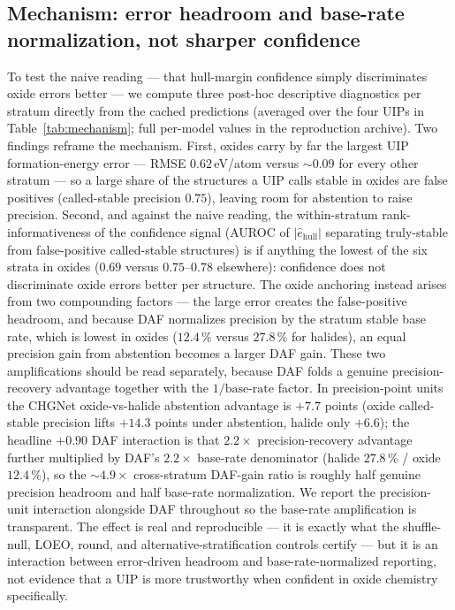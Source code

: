 \documentclass[11pt]{article}
\begin{document}
\subsection{Mechanism: error headroom and base-rate normalization, not sharper confidence}

To test the naive reading --- that hull-margin confidence simply discriminates oxide errors
better --- we compute three post-hoc descriptive diagnostics per stratum directly from the
cached predictions (averaged over the four UIPs in Table~\ref{tab:mechanism}; full per-model
values in the reproduction archive). Two findings reframe the mechanism. First, oxides carry by
far the largest UIP formation-energy error --- RMSE $0.62$\,eV/atom versus $\sim\!0.09$ for every
other stratum --- so a large share of the structures a UIP calls stable in oxides are false
positives (called-stable precision $0.75$), leaving room for abstention to raise precision.
Second, and against the naive reading, the within-stratum rank-informativeness of the
confidence signal (AUROC of $|\hat{e}_{\mathrm{hull}}|$ separating truly-stable from
false-positive called-stable structures) is if anything the lowest of the six strata in
oxides ($0.69$ versus $0.75$--$0.78$ elsewhere): confidence does not discriminate oxide errors
better per structure. The oxide anchoring instead arises from two compounding factors --- the
large error creates the false-positive headroom, and because DAF normalizes precision by the
stratum stable base rate, which is lowest in oxides ($12.4\,\%$ versus $27.8\,\%$ for halides),
an equal precision gain from abstention becomes a larger DAF gain. These two amplifications
should be read separately, because DAF folds a genuine precision-recovery advantage together
with the $1/\text{base-rate}$ factor. In precision-point units the CHGNet oxide-vs-halide
abstention advantage is $+7.7$ points (oxide called-stable precision lifts $+14.3$ points under
abstention, halide only $+6.6$); the headline $+0.90$ DAF interaction is that $2.2\times$
precision-recovery advantage further multiplied by DAF's $2.2\times$ base-rate denominator
(halide $27.8\,\%$ / oxide $12.4\,\%$), so the $\sim\!4.9\times$ cross-stratum DAF-gain ratio
is roughly half genuine precision headroom and half base-rate normalization. We report the
precision-unit interaction alongside DAF throughout so the base-rate amplification is transparent.
The effect is
real and reproducible --- it is exactly what the shuffle-null, LOEO, round, and
alternative-stratification controls certify --- but it is an interaction between error-driven
headroom and base-rate-normalized reporting, not evidence that a UIP is more trustworthy when
confident in oxide chemistry specifically.
\end{document}
